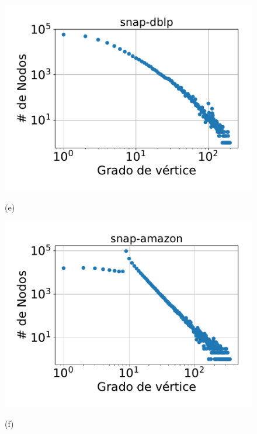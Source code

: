 \begin{figure}
    	\begin{minipage}{1\textwidth}
    		\centering
    		\begin{minipage}{.45\textwidth}
    			\centering
    			\includegraphics[width=1\linewidth]{img/grades/snap-dblp.pdf}
    			
    			(e)
    		\end{minipage}
    		\begin{minipage}{.45\textwidth}
    			\centering
    			\includegraphics[width=1\linewidth]{img/grades/snap-amazon.pdf}
    			
    			(f)
    		\end{minipage}  
    	\end{minipage}
    	

\end{figure}
